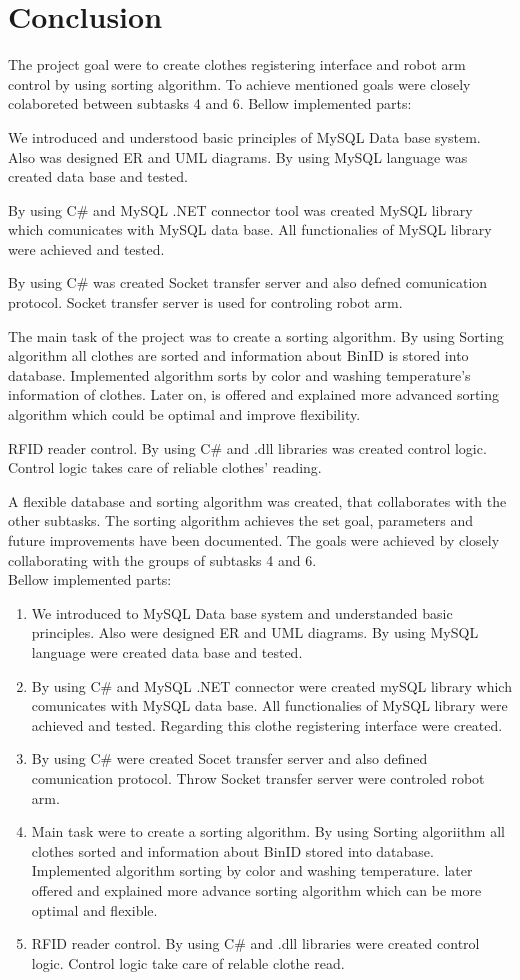 \section{Conclusion}
The project goal were to create clothes registering interface and robot arm
control by using sorting algorithm. To achieve mentioned goals were closely
colaboreted between subtasks 4 and 6. Bellow implemented parts:

We introduced and understood basic
principles of MySQL Data base system. Also was designed ER and UML diagrams. By using MySQL language was created data base and tested.

By using C# and MySQL .NET connector tool was created MySQL library which comunicates with MySQL data base. All functionalies of MySQL library were achieved and tested.

By using C# was created Socket transfer server and also defned comunication protocol. Socket transfer server is used for controling robot arm.

The main task of the project was to create a sorting algorithm. By using Sorting algorithm all clothes are sorted and information about BinID is stored into
database. Implemented algorithm sorts by color and washing temperature's information of clothes. Later on, is offered and explained more advanced sorting algorithm which could be optimal and improve flexibility.

RFID reader control. By using C# and .dll libraries was created control logic. Control logic takes care of reliable clothes' reading.



A flexible database and sorting algorithm was created, that collaborates with the other subtasks. The sorting algorithm achieves the set goal, parameters and future improvements have been documented. The goals were achieved by closely collaborating with the groups of subtasks 4 and 6. 
\\
Bellow implemented parts:
\begin{enumerate}
	\item We introduced to MySQL Data base system and understanded basic principles. Also were designed ER and UML diagrams. By using MySQL language were created data base and tested.
	\item By using C\# and MySQL .NET connector were created mySQL library which comunicates with MySQL data base. All functionalies of MySQL library were achieved and tested. Regarding this clothe registering interface were created.
	\item By using C\# were created Socet transfer server and also defined comunication protocol. Throw Socket transfer server were controled robot arm.
	\item Main task were to create a sorting algorithm. By using Sorting algoriithm all clothes sorted and information about BinID stored into database. Implemented algorithm sorting by color and washing temperature. later offered and explained more advance sorting algorithm which can be more optimal and flexible.
	\item RFID reader control. By using C\# and .dll libraries were created control logic. Control logic take care of relable clothe read.
\end{enumerate}